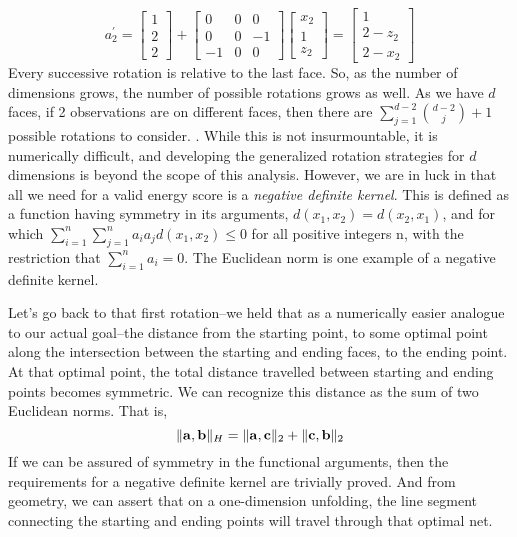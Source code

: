   \begin{equation}
    \label{eq:2drotation}
    a_2^{\prime} = \begin{bmatrix}
    1 \\
    2 \\
    2
    \end{bmatrix}
    +
    \begin{bmatrix}
    0 & 0 & 0  \\
    0 & 0 & -1 \\
    -1 & 0 & 0
    \end{bmatrix}
    \begin{bmatrix}
    x_2 \\
    1 \\
    z_2
    \end{bmatrix} = \begin{bmatrix}
    1 \\
    2 - z_2 \\
    2 - x_2
    \end{bmatrix}
  \end{equation}
Every successive rotation is relative to the last face.  So, as the number of dimensions grows, the
  number of possible rotations grows as well.  As we have $d$ faces, if 2 observations are on
  different faces, then there are $\sum_{j = 1}^{d-2}\binom{d-2}{j} + 1$ possible rotations to
  consider. .  While this is not
  insurmountable, it is numerically difficult, and developing the generalized rotation strategies
  for $d$ dimensions is beyond the scope of this analysis. However, we are in luck in that all we
  need for a valid energy score is a \emph{negative definite kernel}.  This is defined as a function
  having symmetry in its arguments, $d(x_1,x_2) = d(x_2,x_1)$, and for which
  $\sum_{i =1}^n\sum_{j=1}^na_ia_jd(x_1,x_2) \leq 0$ for all positive integers n, with the
  restriction that $\sum_{i=1}^na_i = 0$.  The Euclidean norm is one example of a negative definite
  kernel.

Let's go back to that first rotation--we held that as a numerically easier analogue to our actual
  goal--the distance from the starting point, to some optimal point along the intersection between
  the starting and ending faces, to the ending point.  At that optimal point, the total distance
  travelled between starting and ending points becomes symmetric.  We can
  recognize this distance as the sum of two Euclidean norms.  That is,
  \begin{equation}
    \lVert {\bf a},{\bf b}\rVert_{H} = \lVert {\bf a}, {\bf c} \rVert_2 + \lVert {\bf c},{\bf b}\rVert_2
  \end{equation}
  If we can be assured of symmetry in the functional arguments, then the requirements for a negative
  definite kernel are trivially proved.  And from geometry, we can
  assert that on a one-dimension unfolding, the line segment connecting the starting and ending
  points will travel through that optimal net.

